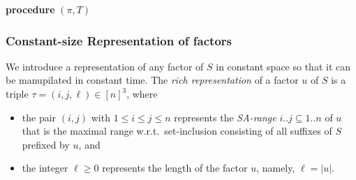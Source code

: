 \documentclass{article}
\begin{document}
\begin{algorithm}[t]
  \caption{
    A subprocedure $\Rec$ for constructing the extended LPT-tree $\LPT[+](S)$ of the string $S$ on an index $\sig I = (\SA, \ISA, \LCP, S)$.
}\label{algo:rec}
  \textbf{procedure} \Rec$(\pi, T)$\;
\end{algorithm}

\subsubsection{Constant-size Representation of factors}
We introduce a representation of any factor of $S$ in constant space so that it can be manupilated in constant time. 
The \textit{rich representation} of a factor $u$ of $S$ is a triple $\tau = (i, j, \ell) \in [n]^3$, where
\begin{itemize}
\item the pair $(i, j)$ with $1\le i\le j\le n$ represents the \textit{SA-range} $i..j\subseteq 1..n$ of $u$ that is the maximal range w.r.t.~set-inclusion consisting of all suffixes of $S$ prefixed by $u$, and  
  
\item the integer $\ell\ge 0$ represents the length of the factor $u$, namely, $\ell = |u|$. 
\end{itemize}
\end{document}
